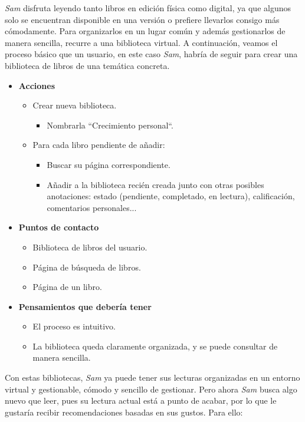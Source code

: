 \textit{Sam} disfruta leyendo tanto libros en edición física como digital, ya que algunos solo se encuentran disponible en una versión o prefiere llevarlos consigo más cómodamente. Para organizarlos en un lugar común y además gestionarlos de manera sencilla, recurre a una biblioteca virtual. A continuación, veamos el proceso básico que un usuario, en este caso \textit{Sam}, habría de seguir para crear una biblioteca de libros de una temática concreta.

\begin{itemize}
    \item \textbf{Acciones}
    \begin{itemize}
        \item Crear nueva biblioteca.
        \begin {itemize}
            \item Nombrarla ``Crecimiento personal``.
        \end{itemize}
        \item Para cada libro pendiente de añadir:
        \begin{itemize}
            \item Buscar su página correspondiente.
            \item Añadir a la biblioteca recién creada junto con otras posibles anotaciones: estado (pendiente, completado, en lectura), calificación, comentarios personales...
        \end{itemize}
    \end{itemize}
    \item \textbf{Puntos de contacto}
    \begin{itemize}
        \item Biblioteca de libros del usuario.
        \item Página de búsqueda de libros.
        \item Página de un libro.
    \end{itemize}
    \item \textbf{Pensamientos que debería tener}
    \begin{itemize}
        \item El proceso es intuitivo.
        \item La biblioteca queda claramente organizada, y se puede consultar de manera sencilla.
    \end{itemize}
\end{itemize}

Con estas bibliotecas, \textit{Sam} ya puede tener sus lecturas organizadas en un entorno virtual y gestionable, cómodo y sencillo de gestionar. Pero ahora \textit{Sam} busca algo nuevo que leer, pues su lectura actual está a punto de acabar, por lo que le gustaría recibir recomendaciones basadas en sus gustos. Para ello:

